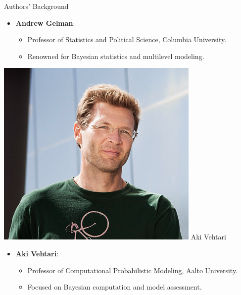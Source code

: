 \documentclass{beamer}
\begin{document}
\begin{frame}{Authors' Background}
\begin{minipage}{0.3\textwidth}
\end{minipage}
\hfill
\begin{minipage}{0.65\textwidth}
    \begin{itemize}
        \item \textbf{Andrew Gelman}:
        \begin{itemize}
            \item Professor of Statistics and Political Science, Columbia University.
            \item Renowned for Bayesian statistics and multilevel modeling.
        \end{itemize}
    \end{itemize}
\end{minipage}

\vspace{1em}

\begin{minipage}{0.3\textwidth}
    \includegraphics[width=\textwidth]{aki_vehtari.png} 
    \small Aki Vehtari
\end{minipage}
\hfill
\begin{minipage}{0.65\textwidth}
    \begin{itemize}
        \item \textbf{Aki Vehtari}:
        \begin{itemize}
            \item Professor of Computational Probabilistic Modeling, Aalto University.
            \item Focused on Bayesian computation and model assessment.
        \end{itemize}
    \end{itemize}
\end{minipage}
\end{frame}
\end{document}
